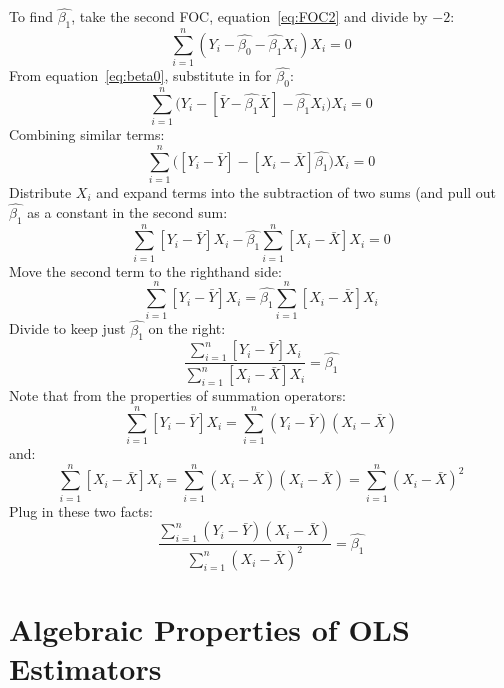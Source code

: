 \documentclass{article}
\begin{document}
To find $\hat{\beta_1}$, take the second FOC, equation~\ref{eq:FOC2} and divide by $-2$: 
\begin{equation}
\displaystyle\sum^n_{i=1} (Y_i-\hat{\beta_0}-\hat{\beta_1} X_i)X_i=0 	
\end{equation}
From equation~\ref{eq:beta0}, substitute in for $\hat{\beta_0}$: 
\begin{equation}
\displaystyle\sum^n_{i=1} \bigg(Y_i-[\bar{Y}-\hat{\beta_1}\bar{X}]-\hat{\beta_1} X_i\bigg)X_i=0 	
\end{equation}
Combining similar terms:
\begin{equation}
\displaystyle\sum^n_{i=1} \bigg([Y_i-\bar{Y}]-[X_i-\bar{X}]\hat{\beta_1}\bigg)X_i=0 	
\end{equation}
Distribute $X_i$ and expand terms into the subtraction of two sums (and pull out $\hat{\beta_1}$ as a constant in the second sum: 
\begin{equation}
\displaystyle\sum^n_{i=1} [Y_i-\bar{Y}]X_i-\hat{\beta_1}\displaystyle\sum^n_{i=1}[X_i-\bar{X}]X_i=0 	
\end{equation}
Move the second term to the righthand side: 
\begin{equation}
\displaystyle\sum^n_{i=1} [Y_i-\bar{Y}]X_i=\hat{\beta_1}\displaystyle\sum^n_{i=1}[X_i-\bar{X}]X_i	
\end{equation}
Divide to keep just $\hat{\beta_1}$ on the right: 
\begin{equation}
	\frac{\displaystyle\sum^n_{i=1} [Y_i-\bar{Y}]X_i}{\displaystyle\sum^n_{i=1}[X_i-\bar{X}]X_i}=\hat{\beta_1}
\end{equation}
Note that from the properties of summation operators: 
\begin{equation*}
	\displaystyle\sum^n_{i=1} [Y_i-\bar{Y}]X_i=\displaystyle\sum^n_{i=1} (Y_i-\bar{Y})(X_i-\bar{X})
\end{equation*}
and: 
\begin{equation*}
	\displaystyle\sum^n_{i=1} [X_i-\bar{X}]X_i=\displaystyle\sum^n_{i=1} (X_i-\bar{X})(X_i-\bar{X})=\displaystyle\sum^n_{i=1}(X_i-\bar{X})^2
\end{equation*}
Plug in these two facts: 
\begin{equation}
	\frac{\displaystyle\sum^n_{i=1} (Y_i-\bar{Y})(X_i-\bar{X})}{\displaystyle\sum^n_{i=1}(X_i-\bar{X})^2}=\hat{\beta_1}
\end{equation}

\section{Algebraic Properties of OLS Estimators}
\end{document}
